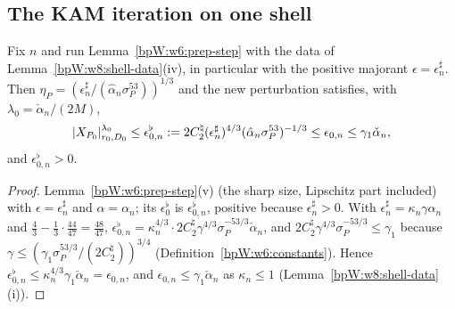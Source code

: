 \subsection{The KAM iteration on one shell}\label{bpW:w8:iter-sec}

\begin{lemma}\label{bpW:w8:sharp-prep}
Fix $n$ and run Lemma~\ref{bpW:w6:prep-step} with the data of Lemma~\ref{bpW:w8:shell-data}(iv), in particular with the positive
majorant $\epsilon=\epsilon^\sharp_n$. Then $\eta_P=(\epsilon^\sharp_n/(\hat\alpha_n\sigma_P^{53}))^{1/3}$ and the new perturbation satisfies,
with $\lambda_0=\check\alpha_n/(2M)$,
\[\lvert X_{P_0}\rvert^{\lambda_0}_{r_0,D_0}\le\epsilon^\flat_{0,n}:=2C^\natural_2(\epsilon^\sharp_n)^{4/3}(\hat\alpha_n\sigma_P^{53})^{-1/3}
\le\epsilon_{0,n}\le\gamma_1\check\alpha_n,\]
and $\epsilon^\flat_{0,n}>0$.
\end{lemma}
\begin{proof}
\label{stepW:w8:sp-step} Lemma~\ref{bpW:w6:prep-step}(v) (the sharp size, Lipschitz part included) with
$\epsilon=\epsilon^\sharp_n$ and $\alpha=\alpha_n$; its $\epsilon^\flat_0$ is $\epsilon^\flat_{0,n}$, positive because $\epsilon^\sharp_n>0$.
\label{stepW:w8:sp-cmp} With $\epsilon^\sharp_n=\kappa_n\gamma\alpha_n$ and $\frac43-\frac13\cdot\frac{44}{47}=\frac{48}{47}$,
$\epsilon^\flat_{0,n}=\kappa_n^{4/3}\cdot2C^\natural_2\gamma^{4/3}\sigma_P^{-53/3}\check\alpha_n$, and
$2C^\natural_2\gamma^{4/3}\sigma_P^{-53/3}\le\gamma_1$ because $\gamma\le(\gamma_1\sigma_P^{53/3}/(2C^\natural_2))^{3/4}$
(Definition~\ref{bpW:w6:constants}). Hence $\epsilon^\flat_{0,n}\le\kappa_n^{4/3}\gamma_1\check\alpha_n=\epsilon_{0,n}$, and
$\epsilon_{0,n}\le\gamma_1\check\alpha_n$ as $\kappa_n\le1$ (Lemma~\ref{bpW:w8:shell-data}(i)).
\end{proof}

